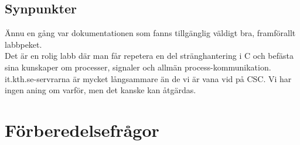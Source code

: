 \documentclass[paper=a4, fontsize=11pt]{scrartcl} %
\numberwithin{equation}{section} %
\numberwithin{figure}{section} %
\numberwithin{table}{section} %
\begin{document}
\subsection{Synpunkter}
Ännu en gång var dokumentationen som fanns tillgänglig väldigt bra, framförallt labbpeket.\\

Det är en rolig labb där man får repetera en del stränghantering i C 
och befästa sina kunskaper om processer, signaler och allmän process-kommunikation.\\

it.kth.se-servrarna är mycket långsammare än de vi är vana vid på CSC.
Vi har ingen aning om varför, men det kanske kan åtgärdas.




\section{Förberedelsefrågor}
\end{document}
